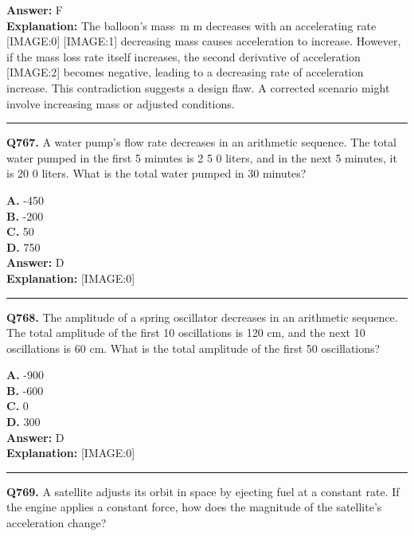 \documentclass[12pt]{article}
\begin{document}
\textbf{Answer:} F \\
\textbf{Explanation:} The balloon's mass m
m
decreases with an accelerating rate
[IMAGE:0]
[IMAGE:1]
decreasing mass causes acceleration to increase. However, if the mass loss rate itself increases, the second derivative of acceleration
[IMAGE:2]
becomes negative, leading to a decreasing rate of acceleration increase. This contradiction suggests a design flaw. A corrected scenario might involve increasing mass or adjusted conditions.

\hrule
\vspace{1em}


\noindent
\textbf{Q767.} A water pump's flow rate decreases in an arithmetic sequence. The total water pumped in the first 5 minutes is 2
5
0 liters, and in the next 5 minutes, it is
20
0 liters. What is the total water pumped in 30 minutes?



\textbf{A.} -450 \\
\textbf{B.} -200 \\
\textbf{C.} 50 \\
\textbf{D.} 750 \\

\textbf{Answer:} D \\
\textbf{Explanation:} [IMAGE:0]

\hrule
\vspace{1em}


\noindent
\textbf{Q768.} The amplitude of a spring oscillator decreases in an arithmetic sequence. The total amplitude of the first 10 oscillations is 120 cm, and the next 10 oscillations is 60 cm. What is the total amplitude of the first 50 oscillations?



\textbf{A.} -900 \\
\textbf{B.} -600 \\
\textbf{C.} 0 \\
\textbf{D.} 300 \\

\textbf{Answer:} D \\
\textbf{Explanation:} [IMAGE:0]

\hrule
\vspace{1em}


\noindent
\textbf{Q769.} A satellite adjusts its orbit in space by ejecting fuel at a constant rate. If the engine applies a constant force, how does the magnitude of the satellite's acceleration change?
\end{document}
